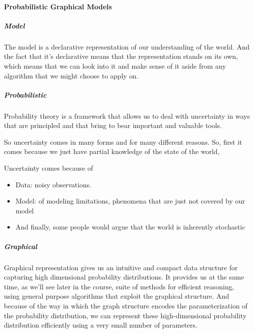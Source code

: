 


\paragraph{Probabilistic Graphical Models}

\subparagraph{Model}

The model is a declarative representation of our understanding of the world. And the fact that it's declarative means that the representation stands on its own, which means that we can look into it and make sense of it aside from any algorithm that we might choose to apply on. 

\subparagraph{Probabilistic}

Probability theory is a framework that allows us to deal with uncertainty in ways that are principled and that bring to bear important and valuable tools.

So uncertainty comes in many forms and for many different reasons.
So, first it comes because we just have partial knowledge of the state of the world, 

\vspace{0.3cm}
Uncertainty comes because of 
\begin{itemize}
 \item Data: noisy observations. 
 \item Model: of modeling limitations, phenomena that are just not covered by our model
 \item And finally, some people would argue that the world is inherently stochastic
\end{itemize}

\subparagraph{Graphical}

Graphical representation gives us an intuitive and compact data structure for capturing high dimensional probability distributions.
It provides us at the same time, as we'll see later in the course,  suite of methods for efficient reasoning,
using general purpose algorithms that exploit the graphical structure.
And because of the way in which the graph structure encodes the parameterization of the probability distribution, we can represent these high-dimensional probability distribution efficiently using a very small number of parameters.

